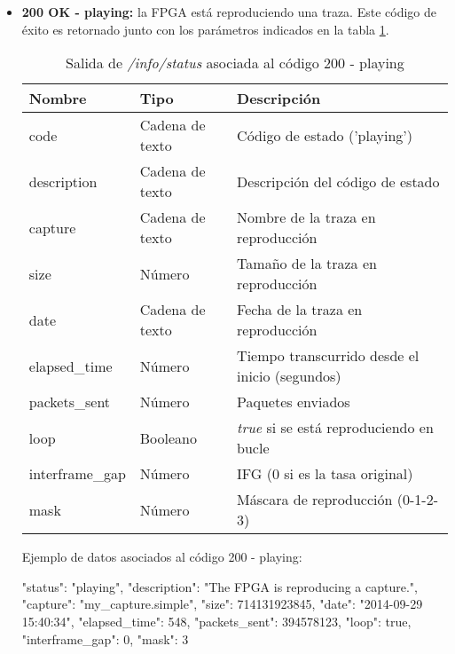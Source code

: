 \begin{itemize}
\item{\textbf{200 OK - playing:} la \gls{FPGA} está reproduciendo una \gls{traza}. Este código de éxito es retornado junto con los parámetros indicados en la tabla \ref{extra:api:infostatus:playing}.
\begin{table}[H]
\centering
\begin{tabular}{|l|l|l|}
\hline
\rowcolor[HTML]{F5F5F5}
\textbf{Nombre}  & \textbf{Tipo}   & \textbf{Descripción}                            \\ \hline
code             & Cadena de texto & Código de estado ('playing')                    \\ \hline
description      & Cadena de texto & Descripción del código de estado                \\ \hline
capture          & Cadena de texto & Nombre de la \gls{traza} en reproducción        \\ \hline
size             & Número          & Tamaño de la \gls{traza} en reproducción        \\ \hline
date             & Cadena de texto & Fecha de la \gls{traza} en reproducción         \\ \hline
elapsed\_time    & Número          & Tiempo transcurrido desde el inicio (segundos)  \\ \hline
packets\_sent    & Número          & Paquetes enviados                               \\ \hline
loop             & Booleano        & \textit{true} si se está reproduciendo en bucle \\ \hline
interframe\_gap  & Número          & \gls{IFG} (0 si es la tasa original)            \\ \hline
mask             & Número          & Máscara de reproducción (0-1-2-3)               \\ \hline
\end{tabular}
\caption{Salida de \textit{/info/status} asociada al código 200 - playing}
\label{extra:api:infostatus:playing}
\end{table}
\begin{minipage}{\textwidth}
Ejemplo de datos asociados al código 200 - playing:

\begin{code}[language=json]
{
  "status": "playing",
  "description": "The FPGA is reproducing a capture.",
  "capture": "my_capture.simple",
  "size": 714131923845,
  "date": "2014-09-29 15:40:34",
  "elapsed_time": 548,
  "packets_sent": 394578123,
  "loop": true,
  "interframe_gap": 0,
  "mask": 3
}
\end{code}
\end{minipage}
}


\end{itemize}
